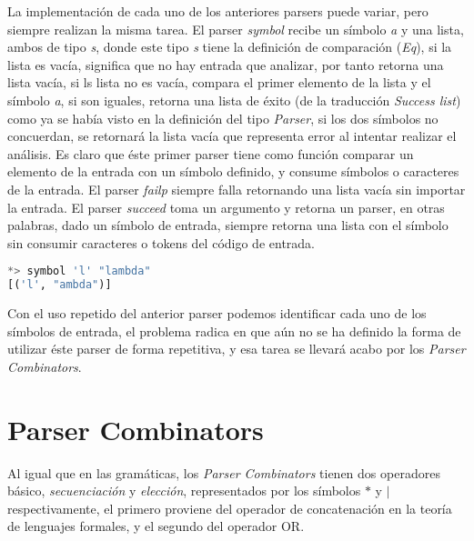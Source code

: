

La implementación de cada uno de los anteriores parsers puede variar, pero siempre realizan la misma tarea. El parser \emph{symbol} recibe un símbolo \emph{a} y una lista, ambos de tipo \emph{s}, donde este tipo \emph{s} tiene la definición de comparación (\emph{Eq}), si la lista es vacía, significa que no hay entrada que analizar, por tanto retorna una lista vacía, si ls lista no es vacía, compara el primer elemento de la lista y el símbolo \emph{a}, si son iguales, retorna una lista de éxito (de la traducción \emph{Success list}) como ya se había visto en la definición del tipo \emph{Parser}, si los dos símbolos no concuerdan, se retornará la lista vacía que representa error al intentar realizar el análisis. Es claro que éste primer parser tiene como función comparar un elemento de la entrada con un símbolo definido, y consume símbolos o caracteres de la entrada. El parser \emph{failp} siempre falla retornando una lista vacía sin importar la entrada. El parser \emph{succeed} toma un argumento y retorna un parser, en otras palabras, dado un símbolo de entrada, siempre retorna una lista con el símbolo sin consumir caracteres o tokens del código de entrada. \cite{Hutton1996,Jeuring2010,Swierstra2008,Hutton1992}

\begin{lstlisting}[language=Haskell, caption=Ejemplo de la utilización del parser symbol en GHCi]
*> symbol 'l' "lambda"
[('l', "ambda")]
\end{lstlisting}

Con el uso repetido del anterior parser podemos identificar cada uno de los símbolos de entrada, el problema radica en que aún no se ha definido la forma de utilizar éste parser de forma repetitiva, y esa tarea se llevará acabo por los \emph{Parser Combinators}.

\section{Parser Combinators}

Al igual que en las gramáticas, los \emph{Parser Combinators} tienen dos operadores básico,  \emph{secuenciación} y \emph{elección}, representados por los símbolos $*$ y $|$ respectivamente, el primero proviene del operador de concatenación en la teoría de lenguajes formales, y el segundo del operador OR.

